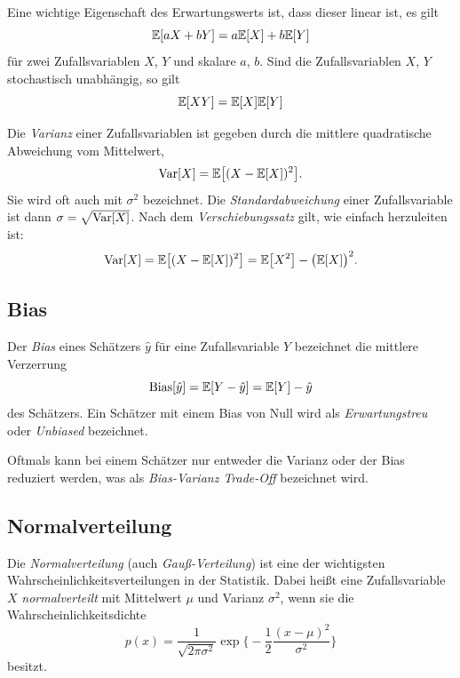 			Eine wichtige Eigenschaft des Erwartungswerts ist, dass dieser linear ist, \dh es gilt
			\begin{equation}
				\mathbb{E}[aX + bY] = a \mathbb{E}[X] + b \mathbb{E}[Y]
			\end{equation}
			für zwei Zufallsvariablen \(X\), \(Y\) und skalare \(a\), \(b\). Sind die Zufallsvariablen \(X\), \(Y\) stochastisch unabhängig, so gilt
			\begin{equation}
				\mathbb{E}[XY] = \mathbb{E}[X] \mathbb{E}[Y]
			\end{equation}

			Die \emph{Varianz} einer Zufallsvariablen ist gegeben durch die mittlere quadratische Abweichung vom Mittelwert,
			\begin{equation}
				\operatorname{Var}[X] = \mathbb{E}\big[ (X - \mathbb{E}[X])^2 \big].
			\end{equation}
			Sie wird oft auch mit \(\sigma^2\) bezeichnet. Die \emph{Standardabweichung} einer Zufallsvariable ist dann \(\sigma = \sqrt{\operatorname{Var}[X]}\). Nach dem \emph{Verschiebungssatz} gilt, wie einfach herzuleiten ist:
			\begin{equation}
				\operatorname{Var}[X] = \mathbb{E}\big[ (X - \mathbb{E}[X])^2 \big] = \mathbb{E}\big[ X^2 \big] - \big( \mathbb{E}[X] \big)^2.
			\end{equation}

		\subsection{Bias}
			Der \emph{Bias} eines Schätzers \(\hat{y}\) für eine Zufallsvariable \(Y\) bezeichnet die mittlere Verzerrung
			\begin{equation}
				\operatorname{Bias}[\hat{y}] = \mathbb{E}[Y - \hat{y}] = \mathbb{E}[Y] - \hat{y}
			\end{equation}
			des Schätzers. Ein Schätzer mit einem Bias von Null wird als \emph{Erwartungstreu} oder \emph{Unbiased} bezeichnet.

			Oftmals kann bei einem Schätzer nur entweder die Varianz oder der Bias reduziert werden, was als \emph{Bias-Varianz Trade-Off} bezeichnet wird.

		\subsection{Normalverteilung}
			Die \emph{Normalverteilung} (auch \emph{Gauß-Verteilung}) ist eine der wichtigsten Wahrscheinlichkeitsverteilungen in der Statistik. Dabei heißt eine Zufallsvariable \(X\) \emph{normalverteilt} mit Mittelwert \(\mu\) und Varianz \(\sigma^2\), wenn sie die Wahrscheinlichkeitsdichte
			\begin{equation}
				p(x) = \frac{1}{\sqrt{2 \pi \sigma^2}} \exp\bigg\{\!\! -\frac{1}{2} \frac{(x - \mu)^2}{\sigma^2} \bigg\}
			\end{equation}
			besitzt.

